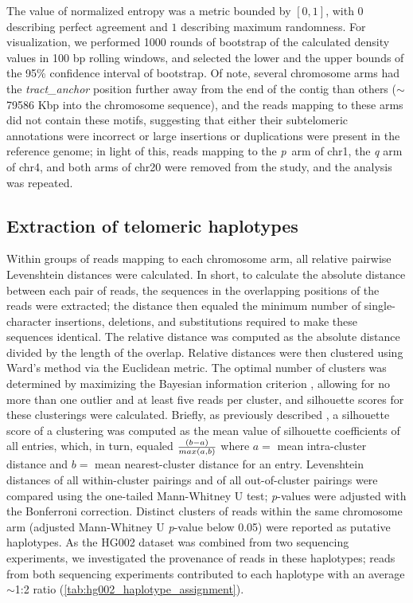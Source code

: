 \documentclass{article}
\begin{document}
The value of normalized entropy was a metric bounded by $ [ 0, 1 ] $, with $ 0 $ describing perfect agreement and $ 1 $ describing maximum randomness.
For visualization, we performed 1000 rounds of bootstrap of the calculated density values in 100 bp rolling windows, and selected the lower and the upper bounds of the 95\% confidence interval of bootstrap.
Of note, several chromosome arms had the \textit{tract\_anchor} position further away from the end of the contig than others ($\sim$79\textendash{}586 Kbp into the chromosome sequence), and the reads mapping to these arms did not contain these motifs, suggesting that either their subtelomeric annotations were incorrect or large insertions or duplications were present in the reference genome; in light of this, reads mapping to the \mbox{\textit{p} arm} of chr1, the \textit{q} arm of chr4, and both arms of chr20 were removed from the study, and the analysis was repeated.

\subsection*{Extraction of telomeric haplotypes}
Within groups of reads mapping to each chromosome arm, all relative pairwise Levenshtein distances were calculated.
In short, to calculate the absolute distance between each pair of reads, the sequences in the overlapping positions of the reads were extracted; the distance then equaled the minimum number of single-character insertions, deletions, and substitutions required to make these sequences identical.
The relative distance was computed as the absolute distance divided by the length of the overlap.
Relative distances were then clustered using Ward's method via the Euclidean metric.
The optimal number of clusters was determined by maximizing the Bayesian information criterion \cite{bic}, allowing for no more than one outlier and at least five reads per cluster, and silhouette scores for these clusterings were calculated.
Briefly, as previously described \cite{silhouette}, a silhouette score of a clustering was computed as the mean value of silhouette coefficients of all entries, which, in turn, equaled $ (b - a) \over{max(a, b)} $ where $ a = $ {\rmfamily mean intra-cluster distance} and $ b = $ {\rmfamily mean nearest-cluster distance} for an entry.
Levenshtein distances of all within-cluster pairings and of all out-of-cluster pairings were compared using the one-tailed Mann-Whitney U test; \textit{p}-values were adjusted with the Bonferroni correction.
Distinct clusters of reads within the same chromosome arm (adjusted Mann-Whitney U \textit{p}-value below 0.05) were reported as putative haplotypes.
As the HG002 dataset was combined from two sequencing experiments, we investigated the provenance of reads in these haplotypes; reads from both sequencing experiments contributed to each haplotype with an average $\sim$1:2 ratio (\autoref{tab:hg002_haplotype_assignment}).
\end{document}
